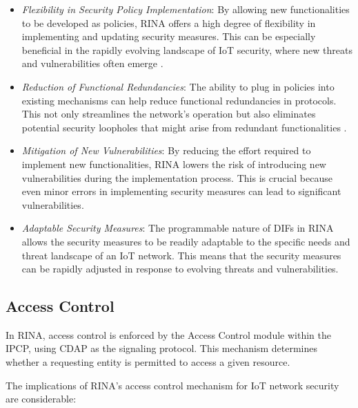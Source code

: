 \documentclass{ieeeaccess}
\begin{document}
\begin{itemize}
	\item \textit{Flexibility in Security Policy Implementation}: By allowing new functionalities to be developed as policies, RINA offers a high degree of flexibility in implementing and updating security measures. This can be especially beneficial in the rapidly evolving landscape of IoT security, where new threats and vulnerabilities often emerge \cite{s20133622}.
	\item \textit{Reduction of Functional Redundancies}: The ability to plug in policies into existing mechanisms can help reduce functional redundancies in protocols. This not only streamlines the network's operation but also eliminates potential security loopholes that might arise from redundant functionalities \cite{en14102818}.
	\item \textit{Mitigation of New Vulnerabilities}: By reducing the effort required to implement new functionalities, RINA lowers the risk of introducing new vulnerabilities during the implementation process. This is crucial because even minor errors in implementing security measures can lead to significant vulnerabilities.	
	\item \textit{Adaptable Security Measures}: The programmable nature of DIFs in RINA allows the security measures to be readily adaptable to the specific needs and threat landscape of an IoT network. This means that the security measures can be rapidly adjusted in response to evolving threats and vulnerabilities.
\end{itemize}

\subsection{Access Control}

In RINA, access control is enforced by the Access Control module within the IPCP, using CDAP as the signaling protocol. This mechanism determines whether a requesting entity is permitted to access a given resource.

The implications of RINA's access control mechanism for IoT network security are considerable:
\end{document}
